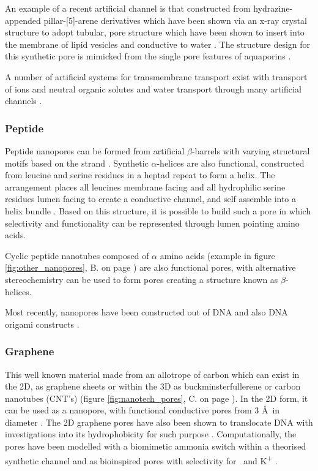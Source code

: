 An example of a recent artificial channel is that constructed from hydrazine-appended pillar-[5]-arene derivatives which have been shown via an x-ray crystal structure to adopt tubular, pore structure which have been shown to insert into the membrane of lipid vesicles and conductive to water \cite{Hu2012}. The structure design for this synthetic pore is mimicked from the single pore features of aquaporins \cite{Verkman2011}. 

A number of artificial systems for transmembrane transport exist with transport of ions and neutral organic solutes \cite{Haynes2011,Cho2011} and water transport \cite{Liu2010} through many artificial channels \cite{Barboiu2013}.


\subsubsection*{Peptide}

Peptide nanopores can be formed from artificial $\beta$-barrels with varying structural motifs based on the strand \cite{Sakai2008}. Synthetic $\alpha$-helices are also functional, constructed from leucine and serine residues in a heptad repeat to form a helix. The arrangement places all leucines membrane facing and all hydrophilic serine residues lumen facing to create a conductive channel, and self assemble into a helix bundle \cite{Lear1997}. Based on this structure, it is possible to build such a pore in which selectivity and functionality can be represented through lumen pointing amino acids.

Cyclic peptide nanotubes \cite{Montenegro2013,Ghadiri1994,Ghadiri1993a} composed of $\alpha$ amino acids (example in figure \ref{fig:other_nanopores}, B. on page \pageref{fig:other_nanopores}) are also functional pores, with alternative stereochemistry can be used to form pores creating a structure known as $\beta$-helices. 

Most recently, nanopores have been constructed out of DNA \cite{Burns2013} and also DNA origami constructs \cite{Bell2012}. 

\subsubsection*{Graphene}

This well known material made from an allotrope of carbon which can exist in the 2D, as graphene sheets or within the 3D as buckminsterfullerene \cite{Kroto1985} or carbon nanotubes (CNT's) \cite{Iijima1991} (figure \ref{fig:nanotech_pores}, C. on page \pageref{fig:other_nanopores}). In the 2D form, it can be used as a nanopore, with functional conductive pores from 3 \AA\ in diameter \cite{Garaj2010}. The 2D graphene pores have also been shown to translocate DNA \cite{Merchant2010,Schneider2010,Min2011,Liang2013,Liang2014a} with investigations into its hydrophobicity for such purpose \cite{Schneider2013c}. Computationally, the pores have been modelled with a  biomimetic ammonia switch within a theorised synthetic channel \cite{Titov2010} and as bioinspired pores with selectivity for \Na\ and K\textsuperscript{+} \cite{He2013}.

